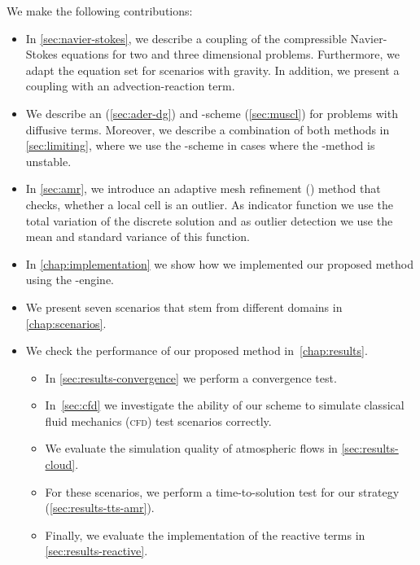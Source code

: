 We make the following contributions:
\begin{itemize}
\item In \cref{sec:navier-stokes}, we describe a coupling of the compressible Navier-Stokes equations for two and three dimensional problems.
Furthermore, we adapt the equation set for scenarios with gravity.
In addition, we present a coupling with an advection-reaction term.
\item We describe an \aderdg{} (\cref{sec:ader-dg}) and \muscl{}-scheme (\cref{sec:muscl}) for problems with diffusive terms.
  Moreover, we describe a combination of both methods in \cref{sec:limiting}, where we use the \muscl{}-scheme in cases where the \aderdg{}-method is unstable.
\item In \cref{sec:amr}, we introduce an adaptive mesh refinement (\amr{}) method that checks, whether a local cell is an outlier.
  As indicator function we use the total variation of the discrete solution and as outlier detection we use the mean and standard variance of this function.
\item In \cref{chap:implementation} we show how we implemented our proposed method using the \exahype{}-engine.
\item We present seven scenarios that stem from different domains in \cref{chap:scenarios}.
\item We check the performance of our proposed method in~\cref{chap:results}.
  \begin{itemize}
  \item In \cref{sec:results-convergence} we perform a convergence test.
  \item In~\cref{sec:cfd} we investigate the ability of our scheme to simulate classical fluid mechanics (\textsc{cfd}) test scenarios correctly.
  \item We evaluate the simulation quality of atmospheric flows in \cref{sec:results-cloud}.
  \item For these scenarios, we perform a time-to-solution test for our \amr{} strategy (\cref{sec:results-tts-amr}).
  \item Finally, we evaluate the implementation of the reactive terms in \cref{sec:results-reactive}.
\end{itemize}
\end{itemize}

